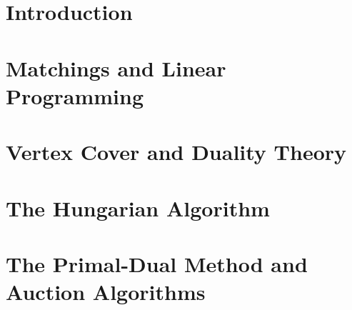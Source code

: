 \documentclass[12pt,twoside]{reedthesis}
\renewcommand{\'}{^{'}}
\theoremstyle{plain}
\theoremstyle{definition}
\begin{document}
\chapter*{Introduction}

	
	
\chapter{Matchings and Linear Programming}



\chapter{Vertex Cover and Duality Theory}



\chapter{The Hungarian Algorithm}



\chapter{The Primal-Dual Method and Auction Algorithms}


	

\backmatter %

\nocite{*}


\end{document}
